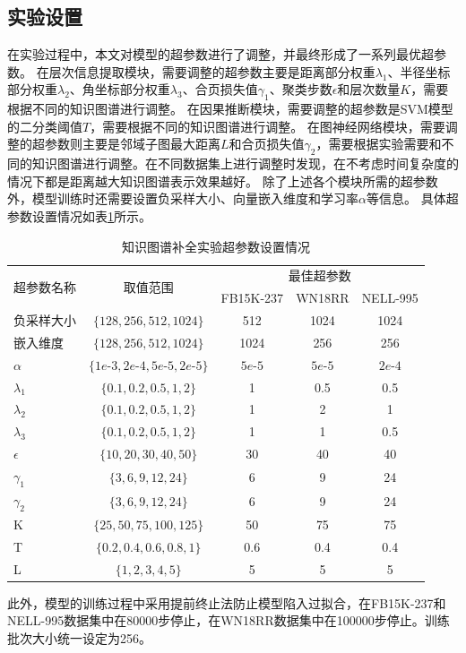 \documentclass[algorithmlist, AutoFakeBold, AutoFakeSlant, figurelist, tablelist, nomlist, engineering]{seuthesix}
\begin{document}
\subsection{实验设置}
在实验过程中，本文对模型的超参数进行了调整，并最终形成了一系列最优超参数。
在层次信息提取模块，需要调整的超参数主要是距离部分权重$\lambda_1$、半径坐标部分权重$\lambda_2$、角坐标部分权重$\lambda_3$、合页损失值$\gamma_1$、聚类步数$\epsilon$和层次数量$K$，需要根据不同的知识图谱进行调整。
在因果推断模块，需要调整的超参数是SVM模型的二分类阈值$T$，需要根据不同的知识图谱进行调整。
在图神经网络模块，需要调整的超参数则主要是邻域子图最大距离$L$和合页损失值$\gamma_2$，需要根据实验需要和不同的知识图谱进行调整。在不同数据集上进行调整时发现，在不考虑时间复杂度的情况下都是距离越大知识图谱表示效果越好。
除了上述各个模块所需的超参数外，模型训练时还需要设置负采样大小、向量嵌入维度和学习率$\alpha$等信息。
具体超参数设置情况如表\ref{Hyperparameters1}所示。
\begin{table}[]
  \centering
  \begin{tabular*}{0.95\textwidth}{@{\extracolsep{\fill}}lcccc}
  \toprule[1pt]
  \multirow{2}{*}{超参数名称} & \multirow{2}{*}{取值范围} & \multicolumn{3}{c}{最佳超参数}\\ 
    & & FB15K-237 & WN18RR & NELL-995 \\ \hline
  负采样大小 & $\{128, 256, 512, 1024\}$ & 512 & 1024 & 1024 \\
  嵌入维度 & $\{128, 256, 512, 1024\}$ & 1024 & 256 & 256 \\
  $\alpha$ & $\{1e\text{-}3, 2e\text{-}4, 5e\text{-}5, 2e\text{-}5\}$ & $5e\text{-}5$ & $5e\text{-}5$ & $2e\text{-}4$ \\
  $\lambda_1$ & $\{0.1, 0.2, 0.5, 1, 2\}$ & 1 & 0.5 & 0.5 \\
  $\lambda_2$ & $\{0.1, 0.2, 0.5, 1, 2\}$ & 1 & 2 & 1 \\
  $\lambda_3$ & $\{0.1, 0.2, 0.5, 1, 2\}$ & 1 & 1 & 0.5 \\
  $\epsilon$ & $\{10, 20, 30, 40, 50\}$ & 30 & 40 & 40 \\
  $\gamma_1$ & $\{3, 6, 9, 12, 24\}$ & 6 & 9 & 24 \\
  $\gamma_2$ & $\{3, 6, 9, 12, 24\}$ & 6 & 9 & 24 \\
  K & $\{25, 50, 75, 100, 125\}$ & 50 & 75 & 75 \\
  T & $\{0.2, 0.4, 0.6, 0.8, 1\}$ & 0.6 & 0.4 & 0.4 \\
  L & $\{1, 2, 3, 4, 5\}$ & 5 & 5 & 5 \\
  \bottomrule[1pt]
  \end{tabular*}
  \caption{知识图谱补全实验超参数设置情况}
  \label{Hyperparameters1}
\end{table}
此外，模型的训练过程中采用提前终止法防止模型陷入过拟合，在FB15K-237和NELL-995数据集中在80000步停止，在WN18RR数据集中在100000步停止。训练批次大小统一设定为256。
\end{document}

